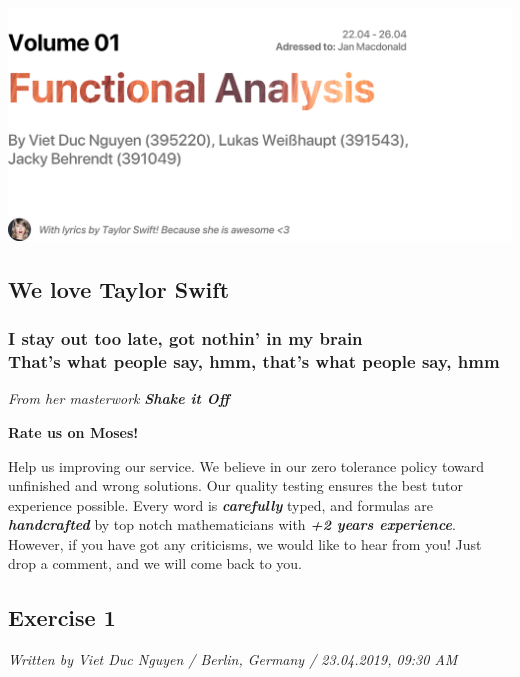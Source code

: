 \documentclass[a4paper]{article}
\renewcommand{\hline}{\noindent\makebox[\linewidth]{\rule{12cm}{1pt}}}
\newcommand{\vip}[1]{\textit{\textbf{#1}}}
\begin{document}
 \noindent \includegraphics[width=17cm]{lol.png}

\hline

\subsection*{We love Taylor Swift}
\subsubsection*{I stay out too late, got nothin' in my brain\\ That's what people say, hmm, that's what people say, hmm}
{\color{grey}\emph{From her masterwork }\vip{Shake it Off}}

\hline 

\textbf{Rate us on Moses!} 

Help us improving our service. We believe in our zero tolerance policy toward unfinished and wrong solutions. Our quality testing ensures the best tutor experience possible. Every word is \vip{carefully} typed, and formulas are \vip{handcrafted} by top notch mathematicians with \vip{+2 years experience}. However, if you have got any criticisms, we would like to hear from you! Just drop a comment, and we will come back to you.

\hline

\newpage

\subsection*{Exercise 1}
{\color{grey}\emph{Written by Viet Duc Nguyen / Berlin, Germany / 23.04.2019, 09:30 AM}}
\end{document}
